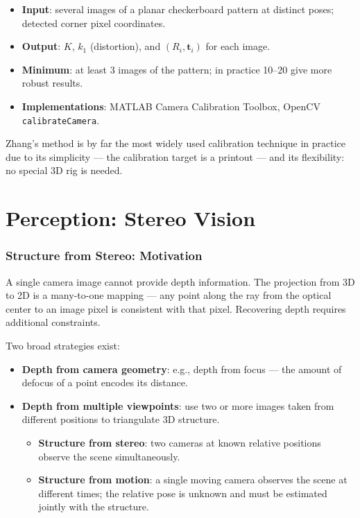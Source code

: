 \documentclass[11pt,a4paper]{article}
\theoremstyle{definition}
\theoremstyle{plain}
\theoremstyle{remark}
\newcommand{\p}[1]{\mathbf{#1}}             %
\begin{document}
\begin{tcolorbox}[colback=blue!5!white,colframe=blue!75!black,title=\textbf{Zhang's Method in Practice}]
\begin{itemize}
    \item \textbf{Input}: several images of a planar checkerboard pattern at distinct poses; detected corner pixel coordinates.
    \item \textbf{Output}: $K$, $k_1$ (distortion), and $(R_i, \p{t}_i)$ for each image.
    \item \textbf{Minimum}: at least 3 images of the pattern; in practice 10--20 give more robust results.
    \item \textbf{Implementations}: MATLAB Camera Calibration Toolbox, OpenCV \texttt{calibrateCamera}.
\end{itemize}
\end{tcolorbox}

Zhang's method is by far the most widely used calibration technique in practice due to its simplicity — the calibration target is a printout — and its flexibility: no special 3D rig is needed.



\part{Perception: Stereo Vision}

\section{Structure from Stereo: Motivation}

A single camera image cannot provide depth information. The projection from 3D to 2D is a many-to-one mapping — any point along the ray from the optical center to an image pixel is consistent with that pixel. Recovering depth requires additional constraints.

Two broad strategies exist:
\begin{itemize}
    \item \textbf{Depth from camera geometry}: e.g., depth from focus — the amount of defocus of a point encodes its distance.
    \item \textbf{Depth from multiple viewpoints}: use two or more images taken from different positions to triangulate 3D structure.
        \begin{itemize}
            \item \textbf{Structure from stereo}: two cameras at known relative positions observe the scene simultaneously.
            \item \textbf{Structure from motion}: a single moving camera observes the scene at different times; the relative pose is unknown and must be estimated jointly with the structure.
        \end{itemize}
\end{itemize}
\end{document}
